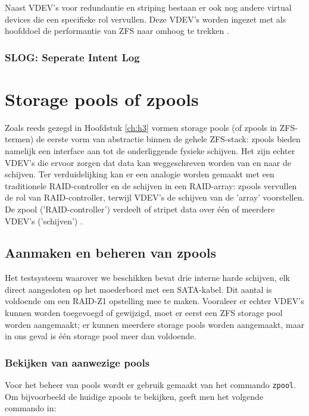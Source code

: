 Naast VDEV's voor redundantie en striping bestaan er ook nog andere virtual devices die een specifieke rol vervullen. Deze VDEV's worden ingezet met als hoofddoel de performantie van ZFS naar omhoog te trekken \autocite{Lucas2015}.

\subsubsection{SLOG: Seperate Intent Log}

\section{Storage pools of zpools}

Zoals reeds gezegd in Hoofdstuk \ref{ch:h3} vormen storage pools (of zpools in ZFS-termen) de eerste vorm van abstractie binnen de gehele ZFS-stack: zpools bieden namelijk een interface aan tot de onderliggende fysieke schijven. Het zijn echter VDEV's die ervoor zorgen dat data kan weggeschreven worden van en naar de schijven. Ter verduidelijking kan er een analogie worden gemaakt met een traditionele RAID-controller en de schijven in een RAID-array: zpools vervullen de rol van RAID-controller, terwijl VDEV's de schijven van de 'array' voorstellen. De zpool ('RAID-controller') verdeelt of stripet data over één of meerdere VDEV's ('schijven') \autocite{Lucas2015}.

\subsection{Aanmaken en beheren van zpools}

Het testsysteem waarover we beschikken bevat drie interne harde schijven, elk direct aangesloten op het moederbord met een SATA-kabel. Dit aantal is voldoende om een RAID-Z1 opstelling mee te maken. Vooraleer er echter VDEV's kunnen worden toegevoegd of gewijzigd, moet er eerst een ZFS storage pool worden aangemaakt; er kunnen meerdere storage pools worden aangemaakt, maar in ons geval is één storage pool meer dan voldoende.

\subsubsection{Bekijken van aanwezige pools}

Voor het beheer van pools wordt er gebruik gemaakt van het commando \texttt{zpool}. Om bijvoorbeeld de huidige zpools te bekijken, geeft men het volgende commando in:

